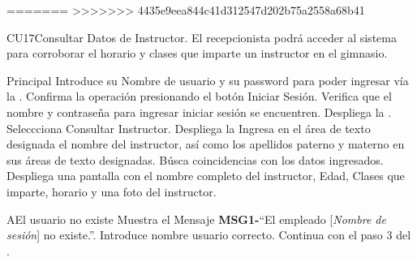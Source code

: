 =======
>>>>>>> 4435e9eea844c41d312547d202b75a2558a68b41
	\begin{UseCase}{CU17}{Consultar Datos de Instructor.}{
			El recepcionista podrá acceder al sistema para corroborar el horario y clases que imparte 
		un instructor en el gimnasio.}
	\end{UseCase}
	\begin{UCtrayectoria}{Principal}
		\UCpaso[\UCactor] Introduce su Nombre de usuario y su password para poder ingresar vía la  \label{CU1LoginJI}.
		\UCpaso[\UCactor] Confirma la operación presionando el botón Iniciar Sesión.
		\UCpaso Verifica que el nombre y contraseña para ingresar iniciar sesión se encuentren.
		\UCpaso Despliega la .
		\UCpaso Seleccciona Consultar Instructor.
		\UCpaso Despliega la 
		\UCpaso[\UCactor]Ingresa en el área de texto designada el nombre del instructor, así como los apellidos paterno y materno
				en sus áreas de texto designadas.
		\UCpaso Búsca coincidencias con los datos ingresados.
		\UCpaso Despliega una pantalla con el nombre completo del instructor, Edad, Clases que imparte, horario y una foto del instructor.

	\end{UCtrayectoria}

		\begin{UCtrayectoriaA}{A}{El usuario no existe}
			\UCpaso[\UCactor] Muestra el Mensaje {\bf MSG1-}``El empleado [{\em Nombre de sesión}] no existe.''.
			\UCpaso[\UCactor] Introduce nombre usuario correcto.
			\UCpaso[] Continua con el paso 3 del .
		\end{UCtrayectoriaA}
		
